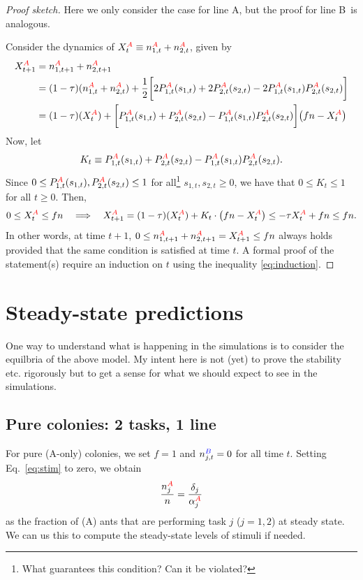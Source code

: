 \documentclass[10pt]{article}
\theoremstyle{remark}
\newcommand{\A}{{\color{red}A}}
\newcommand{\B}{{\color{blue}B}}
\begin{document}
\begin{proof}[Proof sketch]
Here we only consider the case for line \A, but the proof for line \B\ is analogous.

Consider the dynamics of $X_{t}^{\A} \equiv n_{1,t}^{\A}+n_{2,t}^{\A}$, given by
\begin{align*}
    X_{t+1}^{\A} & = n_{1,t+1}^{\A}+n_{2,t+1}^{\A} \\
    &= (1-\tau)(n_{1,t}^{\A}+n_{2,t}^{\A}) + \frac{1}{2}
    \bigg[ 2P_{1,t}^{\A}(s_{1,t}) + 2P_{2,t}^{\A}(s_{2,t}) - 2 P_{1,t}^{\A}(s_{1,t}) P_{2,t}^{\A}(s_{2,t})\bigg] \\
    &= (1-\tau)(X_{t}^{\A}) + 
    \bigg[ P_{1,t}^{\A}(s_{1,t}) + P_{2,t}^{\A}(s_{2,t}) -  P_{1,t}^{\A}(s_{1,t}) P_{2,t}^{\A}(s_{2,t})\bigg]
    \big( fn - X_{t}^{\A} \big)
\end{align*}
Now, let
\begin{align*}
    K_{t} \equiv P_{1,t}^{\A}(s_{1,t}) + P_{2,t}^{\A}(s_{2,t}) -  P_{1,t}^{\A}(s_{1,t}) P_{2,t}^{\A}(s_{2,t}).
\end{align*}
Since $0 \leq P_{1,t}^{\A}(s_{1,t}), P_{2,t}^{\A}(s_{2,t}) \leq 1$ for all\footnote{What guarantees this condition? Can it be violated?} $ s_{1,t}, s_{2,t} \geq 0$, we have that $0\leq K_t \leq 1$ for all $t\geq 0$. Then,
\begin{align}
    0\leq X_{t}^{\A} \leq fn \quad\Longrightarrow\quad X_{t+1}^{\A} = (1-\tau)(X_{t}^{\A}) + 
    K_{t}\cdot\big( fn - X_{t}^{\A} \big) \leq -\tau X_{t}^{\A} + fn \leq fn. \label{eq:induction}
\end{align}
In other words, at time $t+1$, $0\leq n_{1,t+1}^{\A}+n_{2,t+1}^{\A} = X_{t+1}^{\A} \leq fn$ always holds provided that the same condition is satisfied at time $t$.
A formal proof of the statement(s) require an induction on $t$ using the inequality \eqref{eq:induction}.
\end{proof}

\section{Steady-state predictions} \label{sec:ss}
One way to understand what is happening in the simulations is to consider the equilbria of the above model. My intent here is not (yet) to prove the stability etc. rigorously but to get a sense for what we should expect to see in the simulations.

\subsection{Pure colonies: 2 tasks, 1 line}
For pure (\A-only) colonies, we set $f = 1$ and $n_{j,t}^{\B} = 0$ for all time $t$. Setting Eq.~\eqref{eq:stim} to zero, we obtain
\begin{equation}
    \frac{n_j^{\A}}{n} = \frac{\delta_j}{\alpha_j^{\A}}
    \label{eq:ss1}
\end{equation}
as the fraction of (\A) ants that are performing task $j$ ($j = 1,2$) at steady state. We can us this to compute the steady-state levels of stimuli if needed.
\end{document}
